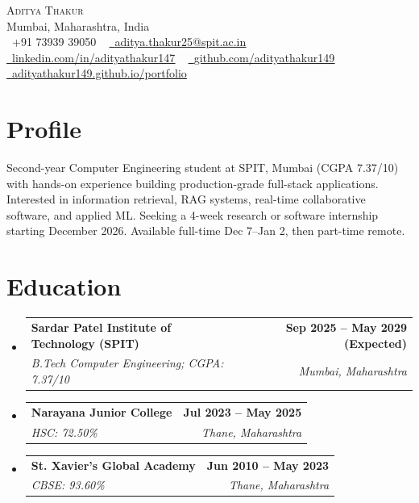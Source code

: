 \documentclass[letterpaper,11pt]{article}
\makeatletter
\newcommand{\resumeSubheading}[4]{
  \vspace{-2pt}\item
    \begin{tabular*}{1.0\textwidth}[t]{l@{\extracolsep{\fill}}r}
      \textbf{#1} & \textbf{\small #2} \\
      \textit{\small#3} & \textit{\small #4} \\
    \end{tabular*}\vspace{-7pt}
}
\newcommand{\resumeSubHeadingListStart}{\begin{itemize}[leftmargin=0.0in, label={}]}
\newcommand{\resumeSubHeadingListEnd}{\end{itemize}}
\makeatother
\begin{document}
\begin{center}
    {\Huge \scshape Aditya Thakur} \\ \vspace{2pt}
    Mumbai, Maharashtra, India \\ \vspace{2pt}
    \small \raisebox{-0.1\height}\faPhone\ +91 73939 39050 ~ \href{mailto:aditya.thakur25@spit.ac.in}{\raisebox{-0.2\height}\faEnvelope\  \underline{aditya.thakur25@spit.ac.in}} ~ 
    \href{https://linkedin.com/in/adityathakur147}{\raisebox{-0.2\height}\faLinkedin\ \underline{linkedin.com/in/adityathakur147}}  ~
    \href{https://github.com/adityathakur149}{\raisebox{-0.2\height}\faGithub\ \underline{github.com/adityathakur149}}  ~
    \href{https://adityathakur149.github.io/portfolio/}{\raisebox{-0.2\height}\faGlobe\ \underline{adityathakur149.github.io/portfolio}}
    \vspace{-6pt}
\end{center}

\section{Profile}
  \small
  Second-year Computer Engineering student at SPIT, Mumbai (CGPA 7.37/10) with hands-on experience building production-grade full-stack applications. Interested in information retrieval, RAG systems, real-time collaborative software, and applied ML. Seeking a 4-week research or software internship starting December 2026. Available full-time Dec 7--Jan 2, then part-time remote.
  \vspace{4pt}

\section{Education}
  \resumeSubHeadingListStart
    \resumeSubheading
      {Sardar Patel Institute of Technology (SPIT)}{Sep 2025 -- May 2029 (Expected)}
      {B.Tech Computer Engineering; CGPA: 7.37/10}{Mumbai, Maharashtra}
    \resumeSubheading
      {Narayana Junior College}{Jul 2023 -- May 2025}
      {HSC: 72.50\%}{Thane, Maharashtra}
    \resumeSubheading
      {St. Xavier's Global Academy}{Jun 2010 -- May 2023}
      {CBSE: 93.60\%}{Thane, Maharashtra}
  \resumeSubHeadingListEnd
  \vspace{4pt}
\end{document}
